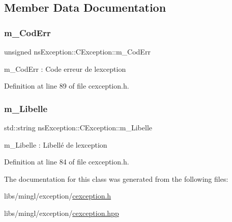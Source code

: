 \subsection{Member Data Documentation}
\mbox{\label{classns_exception_1_1_c_exception_a9610371f15e2c6d99034c46b632d51da}} 
\subsubsection{\texorpdfstring{m\+\_\+\+Cod\+Err}{m\_CodErr}}
{\footnotesize\ttfamily unsigned ns\+Exception\+::\+C\+Exception\+::m\+\_\+\+Cod\+Err\hspace{0.3cm}{\ttfamily [protected]}}



m\+\_\+\+Cod\+Err \+: Code erreur de l\textquotesingle{}exception 



Definition at line 89 of file cexception.\+h.

\mbox{\label{classns_exception_1_1_c_exception_a96c2d653703b2879ff8050cc78bc450a}} 
\subsubsection{\texorpdfstring{m\+\_\+\+Libelle}{m\_Libelle}}
{\footnotesize\ttfamily std\+::string ns\+Exception\+::\+C\+Exception\+::m\+\_\+\+Libelle\hspace{0.3cm}{\ttfamily [protected]}}



m\+\_\+\+Libelle \+: Libellé de l\textquotesingle{}exception 



Definition at line 84 of file cexception.\+h.



The documentation for this class was generated from the following files\+:\begin{DoxyCompactItemize}
\item 
libs/mingl/exception/\hyperlink{cexception_8h}{cexception.\+h}\item 
libs/mingl/exception/\hyperlink{cexception_8hpp}{cexception.\+hpp}\end{DoxyCompactItemize}
